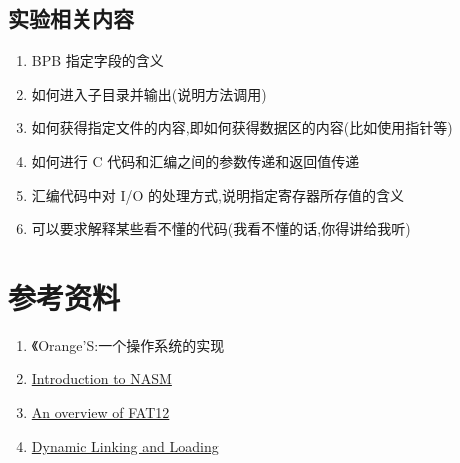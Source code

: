 \documentclass[a4paper]{article}
\begin{document}
\subsection{实验相关内容}
\begin{enumerate}
	\item BPB 指定字段的含义
	\item 如何进入子目录并输出(说明方法调用)
	\item 如何获得指定文件的内容,即如何获得数据区的内容(比如使用指针等)
	\item 如何进行 C 代码和汇编之间的参数传递和返回值传递
	\item 汇编代码中对 I/O 的处理方式,说明指定寄存器所存值的含义
	\item 可以要求解释某些看不懂的代码(我看不懂的话,你得讲给我听)
\end{enumerate}

\section{参考资料}
	\begin{enumerate}
		\item 《Orange'S:一个操作系统的实现
		\item \href{http://jingliu.me/my_files/nasm.pdf}{Introduction to NASM}
		\item \href{http://www.eit.lth.se/fileadmin/eit/courses/eitn50/Projekt1/FAT12Description.pdf}
		{An overview of FAT12}
		\item \href{http://www.iecc.com/linker/linker10.html}{Dynamic Linking and Loading}
	\end{enumerate}
\end{document}

